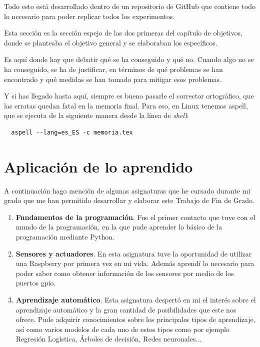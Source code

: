 \documentclass[a4paper, 12pt]{book}
\begin{document}
Todo esto está desarrollado dentro de un repositorio de GitHub que contiene todo lo necesario para poder replicar todos los experimentos.


Esta sección es la sección espejo de las dos primeras del capítulo de objetivos, donde se planteaba el objetivo general y se elaboraban los específicos.

Es aquí donde hay que debatir qué se ha conseguido y qué no. 
Cuando algo no se ha conseguido, se ha de justificar, en términos de qué problemas se han encontrado y qué medidas se han tomado para mitigar esos problemas.

Y si has llegado hasta aquí, siempre es bueno pasarle el corrector ortográfico, que las erratas quedan fatal en la memoria final.
Para eso, en Linux tenemos aspell, que se ejecuta de la siguiente manera desde la línea de \emph{shell}:

\begin{verbatim}
  aspell --lang=es_ES -c memoria.tex
\end{verbatim}

\section{Aplicación de lo aprendido}
\label{sec:aplicacion}

A continuación hago mención de algunas asignaturas que he cursado durante mi grado que me han permitido desarrollar y elaborar este Trabajo de Fin de Grado.

\begin{enumerate}
    \item \textbf{Fundamentos de la programación}. Fue el primer contacto que tuve con el mundo de la programación, en la que pude aprender lo básico de la programación mediante Python.

    \item \textbf{Sensores y actuadores}. En esta asignatura tuve la oportunidad de utilizar una Raspberry por primera vez en mi vida. Además aprendí lo necesario para poder saber como obtener información de los sensores por medio de los puertos gpio.
    
    \item \textbf{Aprendizaje automático}. Esta asignatura despertó en mi el interés sobre el aprendizaje automático y la gran cantidad de posibilidades que este nos ofrece. Pude adquirir conocimientos sobre los principales tipos de aprendizaje, así como varios modelos de cada uno de estos tipos como por ejemplo Regresión Logística, Árboles de decisión, Redes neuronales...

\end{enumerate}
\end{document}
